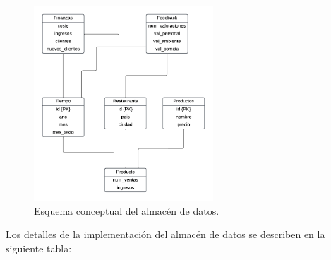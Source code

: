 \documentclass[12pt]{opticajnl}
\begin{document}
\begin{figure}[h]
\centering
\includegraphics[width=0.6\textwidth]{fotos/3.pdf}
\caption{Esquema conceptual del almacén de datos.}
\label{fig:esquema_almacen}
\end{figure}

Los detalles de la implementación del almacén de datos se describen en la siguiente tabla: 
\end{document}
